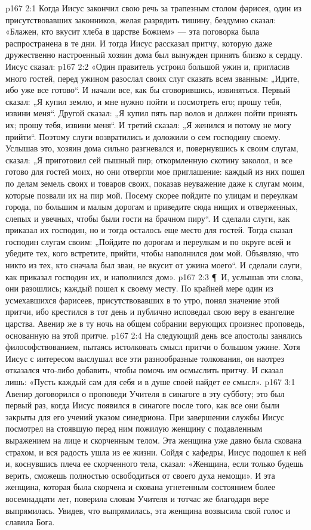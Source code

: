\vs p167 2:1 Когда Иисус закончил свою речь за трапезным столом фарисея, один из присутствовавших законников, желая разрядить тишину, бездумно сказал: «Блажен, кто вкусит хлеба в царстве Божием» --- эта поговорка была распространена в те дни. И тогда Иисус рассказал притчу, которую даже дружественно настроенный хозяин дома был вынужден принять близко к сердцу. Иисус сказал:
\vs p167 2:2 «Один правитель устроил большой ужин и, пригласив много гостей, перед ужином разослал своих слуг сказать всем званным: „Идите, ибо уже все готово“. И начали все, как бы сговорившись, извиняться. Первый сказал: „Я купил землю, и мне нужно пойти и посмотреть его; прошу тебя, извини меня“. Другой сказал: „Я купил пять пар волов и должен пойти принять их; прошу тебя, извини меня“. И третий сказал: „Я женился и потому не могу прийти“. Поэтому слуги возвратились и доложили о сем господину своему. Услышав это, хозяин дома сильно разгневался и, повернувшись к своим слугам, сказал: „Я приготовил сей пышный пир; откормленную скотину заколол, и все готово для гостей моих, но они отвергли мое приглашение: каждый из них пошел по делам земель своих и товаров своих, показав неуважение даже к слугам моим, которые позвали их на пир мой. Посему скорее пойдите по улицам и переулкам города, по большим и малым дорогам и приведите сюда нищих и отверженных, слепых и увечных, чтобы были гости на брачном пиру“. И сделали слуги, как приказал их господин, но и тогда осталось еще место для гостей. Тогда сказал господин слугам своим: „Пойдите по дорогам и переулкам и по округе всей и убедите тех, кого встретите, прийти, чтобы наполнился дом мой. Объявляю, что никто из тех, кто сначала был зван, не вкусит от ужина моего“. И сделали слуги, как приказал господин их, и наполнился дом».
\vs p167 2:3 \P\ И, услышав эти слова, они разошлись; каждый пошел к своему месту. По крайней мере один из усмехавшихся фарисеев, присутствовавших в то утро, понял значение этой притчи, ибо крестился в тот день и публично исповедал свою веру в евангелие царства. Авенир же в ту ночь на общем собрании верующих произнес проповедь, основанную на этой притче.
\vs p167 2:4 На следующий день все апостолы занялись философствованием, пытаясь истолковать смысл притчи о большом ужине. Хотя Иисус с интересом выслушал все эти разнообразные толкования, он наотрез отказался что\hyp{}либо добавить, чтобы помочь им осмыслить притчу. И сказал лишь: «Пусть каждый сам для себя и в душе своей найдет ее смысл».
\vs p167 3:1 Авенир договорился о проповеди Учителя в синагоге в эту субботу; это был первый раз, когда Иисус появился в синагоге после того, как все они были закрыты для его учений указом синедриона. При завершении службы Иисус посмотрел на стоявшую перед ним пожилую женщину с подавленным выражением на лице и скорченным телом. Эта женщина уже давно была скована страхом, и вся радость ушла из ее жизни. Сойдя с кафедры, Иисус подошел к ней и, коснувшись плеча ее скорченного тела, сказал: «Женщина, если только будешь верить, сможешь полностью освободиться от своего духа немощи». И эта женщина, которая была скорчена и скована угнетенным состоянием более восемнадцати лет, поверила словам Учителя и тотчас же благодаря вере выпрямилась. Увидев, что выпрямилась, эта женщина возвысила свой голос и славила Бога.
